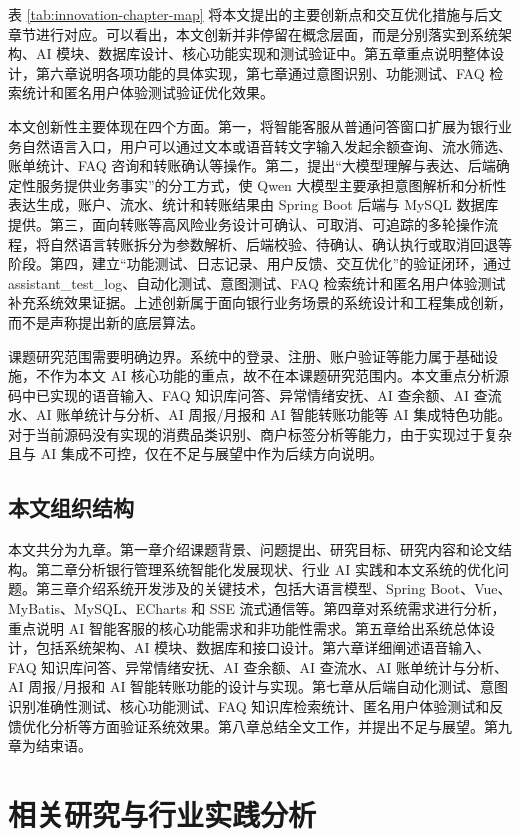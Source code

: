\documentclass[bachelor, print]{xduthesis}
\begin{document}
表 \ref{tab:innovation-chapter-map} 将本文提出的主要创新点和交互优化措施与后文章节进行对应。可以看出，本文创新并非停留在概念层面，而是分别落实到系统架构、AI 模块、数据库设计、核心功能实现和测试验证中。第五章重点说明整体设计，第六章说明各项功能的具体实现，第七章通过意图识别、功能测试、FAQ 检索统计和匿名用户体验测试验证优化效果。

本文创新性主要体现在四个方面。第一，将智能客服从普通问答窗口扩展为银行业务自然语言入口，用户可以通过文本或语音转文字输入发起余额查询、流水筛选、账单统计、FAQ 咨询和转账确认等操作。第二，提出“大模型理解与表达、后端确定性服务提供业务事实”的分工方式，使 Qwen 大模型主要承担意图解析和分析性表达生成，账户、流水、统计和转账结果由 Spring Boot 后端与 MySQL 数据库提供。第三，面向转账等高风险业务设计可确认、可取消、可追踪的多轮操作流程，将自然语言转账拆分为参数解析、后端校验、待确认、确认执行或取消回退等阶段。第四，建立“功能测试、日志记录、用户反馈、交互优化”的验证闭环，通过 assistant\_test\_log、自动化测试、意图测试、FAQ 检索统计和匿名用户体验测试补充系统效果证据。上述创新属于面向银行业务场景的系统设计和工程集成创新，而不是声称提出新的底层算法。

课题研究范围需要明确边界。系统中的登录、注册、账户验证等能力属于基础设施，不作为本文 AI 核心功能的重点，故不在本课题研究范围内。本文重点分析源码中已实现的语音输入、FAQ 知识库问答、异常情绪安抚、AI 查余额、AI 查流水、AI 账单统计与分析、AI 周报/月报和 AI 智能转账功能等 AI 集成特色功能。对于当前源码没有实现的消费品类识别、商户标签分析等能力，由于实现过于复杂且与 AI 集成不可控，仅在不足与展望中作为后续方向说明。

\section{本文组织结构}

本文共分为九章。第一章介绍课题背景、问题提出、研究目标、研究内容和论文结构。第二章分析银行管理系统智能化发展现状、行业 AI 实践和本文系统的优化问题。第三章介绍系统开发涉及的关键技术，包括大语言模型、Spring Boot、Vue、MyBatis、MySQL、ECharts 和 SSE 流式通信等。第四章对系统需求进行分析，重点说明 AI 智能客服的核心功能需求和非功能性需求。第五章给出系统总体设计，包括系统架构、AI 模块、数据库和接口设计。第六章详细阐述语音输入、FAQ 知识库问答、异常情绪安抚、AI 查余额、AI 查流水、AI 账单统计与分析、AI 周报/月报和 AI 智能转账功能的设计与实现。第七章从后端自动化测试、意图识别准确性测试、核心功能测试、FAQ 知识库检索统计、匿名用户体验测试和反馈优化分析等方面验证系统效果。第八章总结全文工作，并提出不足与展望。第九章为结束语。

\chapter{相关研究与行业实践分析}
\end{document}
